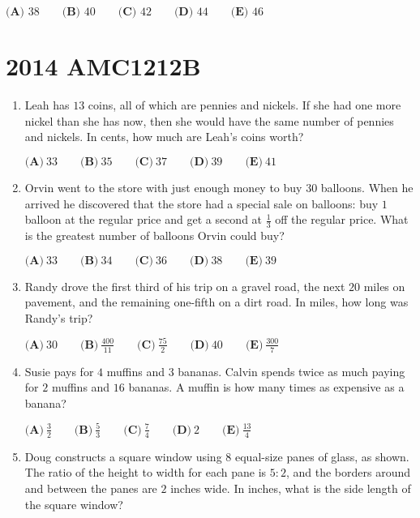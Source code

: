 \documentclass{article}
\begin{document}
\begin{enumerate}[label=\arabic*., itemsep=0.5em]
$\textbf{(A) }38\qquad
\textbf{(B) }40\qquad
\textbf{(C) }42\qquad
\textbf{(D) }44\qquad
\textbf{(E) }46\qquad$\par \vspace{0.5em}\end{enumerate}\newpage\section*{2014 AMC1212B}\begin{enumerate}[label=\arabic*., itemsep=0.5em]\item Leah has $ 13 $ coins, all of which are pennies and nickels. If she had one more nickel than she has now, then she would have the same number of pennies and nickels. In cents, how much are Leah's coins worth?

$ \textbf{(A)}\ 33\qquad\textbf{(B)}\ 35\qquad\textbf{(C)}\ 37\qquad\textbf{(D)}\ 39\qquad\textbf{(E)}\ 41 $\par \vspace{0.5em}\item Orvin went to the store with just enough money to buy $ 30 $ balloons. When he arrived he discovered that the store had a special sale on balloons: buy $ 1 $ balloon at the regular price and get a second at $ \frac{1}{3} $ off the regular price. What is the greatest number of balloons Orvin could buy?

$ \textbf{(A)}\ 33\qquad\textbf{(B)}\ 34\qquad\textbf{(C)}\ 36\qquad\textbf{(D)}\ 38\qquad\textbf{(E)}\ 39 $\par \vspace{0.5em}\item Randy drove the first third of his trip on a gravel road, the next $ 20 $ miles on pavement, and the remaining one-fifth on a dirt road. In miles, how long was Randy's trip?

$ \textbf{(A)}\ 30\qquad\textbf{(B)}\ \frac{400}{11}\qquad\textbf{(C)}\ \frac{75}{2}\qquad\textbf{(D)}\ 40\qquad\textbf{(E)}\ \frac{300}{7} $\par \vspace{0.5em}\item Susie pays for $ 4 $ muffins and $ 3 $ bananas. Calvin spends twice as much paying for $ 2 $ muffins and $ 16 $ bananas. A muffin is how many times as expensive as a banana?

$ \textbf{(A)}\ \frac{3}{2}\qquad\textbf{(B)}\ \frac{5}{3}\qquad\textbf{(C)}\ \frac{7}{4}\qquad\textbf{(D)}\ 2\qquad\textbf{(E)}\ \frac{13}{4} $\par \vspace{0.5em}\item Doug constructs a square window using $ 8 $ equal-size panes of glass, as shown. The ratio of the height to width for each pane is $ 5 : 2 $, and the borders around and between the panes are $ 2 $ inches wide. In inches, what is the side length of the square window?


\end{enumerate}
\end{document}
